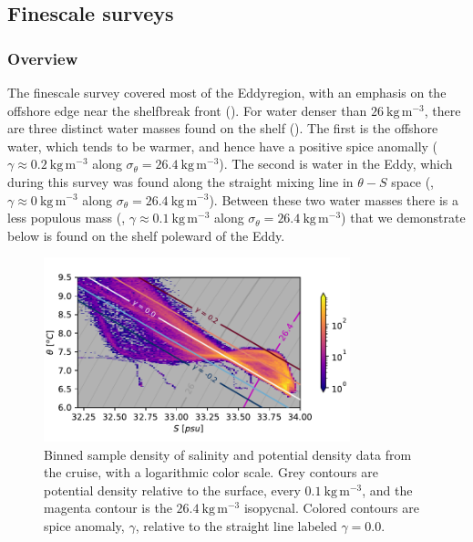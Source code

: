 \documentclass[draft]{agujournal2019}
\newcommand*{\Eddy}{{\sc Eddy}}
\begin{document}
\subsection{Finescale surveys}

\subsubsection{Overview}

The finescale survey covered most of the \Eddy region, with an emphasis on the offshore edge near the shelfbreak front ().  For water denser than $26\ \mathrm{kg\,m^{-3}}$, there are three distinct water masses found on the shelf ().  The first is the offshore water, which tends to be warmer, and hence have a positive spice anomally ($\gamma \approx 0.2\ \mathrm{kg\,m^{-3}}$ along $\sigma_{\theta} = 26.4\ \mathrm{kg\,m^{-3}}$).  The second is water in the \Eddy, which during this survey was found along the straight mixing line in $\theta-S$ space (, $\gamma \approx 0\ \mathrm{kg\,m^{-3}}$ along $\sigma_{\theta} = 26.4\ \mathrm{kg\,m^{-3}}$).  Between these two water masses there is a less populous mass (, $\gamma \approx 0.1\ \mathrm{kg\,m^{-3}}$ along $\sigma_{\theta} = 26.4\ \mathrm{kg\,m^{-3}}$) that we demonstrate below is found on the shelf poleward of the \Eddy.


\begin{figure}[htbp]
  \begin{center}
     \includegraphics[width=3.5in]{TSdensSpice.pdf}
    \caption{Binned sample density of salinity and potential density data from the cruise, with a logarithmic color scale.  Grey contours are potential density relative to the surface, every $0.1\ \mathrm{kg\,m^{-3}}$, and the magenta contour is the $26.4\ \mathrm{kg\,m^{-3}}$ isopycnal.  Colored contours are spice anomaly, $\gamma$, relative to the straight line labeled $\gamma=0.0$.
    \label{fig:TSdensSpice}}
  \end{center}
\end{figure}
\end{document}
